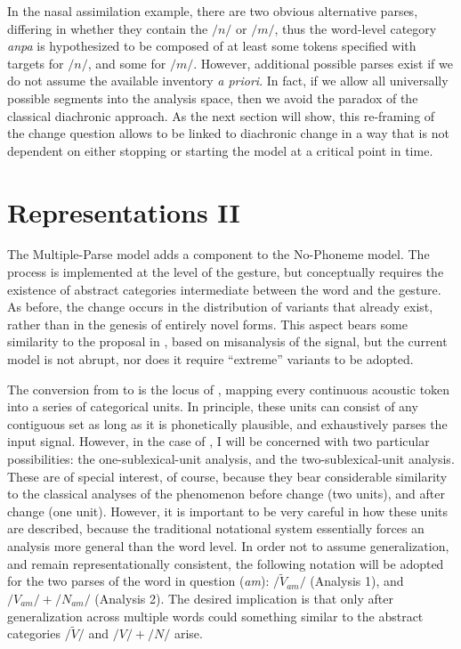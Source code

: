 In the nasal assimilation example, there are two obvious alternative
parses, differing in whether they contain the  $/n/$ or $/m/$,
thus the word-level category \textit{anpa} is hypothesized to be composed
of at least some tokens specified with  targets for $/n/$,
and some for $/m/$. However, additional possible parses exist if
we do not assume the available  inventory \emph{a priori}.
In fact, if we allow all universally possible segments into the analysis
space, then we avoid the  paradox of the classical diachronic
approach. As the next section will show, this re-framing of the change
question allows  to be linked to diachronic change
in a way that is not dependent on either stopping or starting the
model at a critical point in time. 

\section{Representations II}

The Multiple-Parse model adds a  component to the No-Phoneme
model. The process is implemented at the level of the 
gesture, but conceptually requires the existence of abstract categories
intermediate between the word and the gesture. As before, the change
occurs in the distribution of variants that already exist, rather
than in the genesis of entirely novel forms. This aspect bears some
similarity to the proposal in \citet{Baker2011}, based on misanalysis
of the signal, but the current model is not abrupt, nor does it require
“extreme” variants to be adopted.

The conversion from  to  is the locus of 
, mapping every continuous acoustic token into a series of
categorical units. In principle, these units can consist of any contiguous
set as long as it is phonetically plausible, and exhaustively parses
the input signal. However, in the case of , I will
be concerned with two particular possibilities: the one-sublexical-unit
analysis, and the two-sublexical-unit analysis. These are of special
interest, of course, because they bear considerable similarity to
the classical analyses of the phenomenon before change (two units),
and after change (one unit). However, it is important to be very careful
in how these units are described, because the traditional notational
system essentially forces an analysis more general than the
word level. In order not to assume generalization, and remain representationally
consistent, the following notation will be adopted for the two 
parses of the word in question (\textit{am}): $/\tilde{V}_{am}/$ (Analysis
1), and $/V_{am}/+/N_{am}/$ (Analysis 2). The desired implication
is that only after generalization across multiple words could something
similar to the abstract categories $/\widetilde{V}/$ and $/V/+/N/$
arise.

